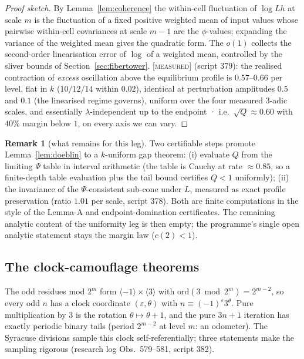 \documentclass[11pt]{article}
\theoremstyle{definition}
\newtheorem{remark}[theorem]{Remark}
\newcommand{\MEASURED}{\textup{[\textsc{measured}]}}
\newcommand{\lam}{\lambda}
\begin{document}
\begin{proof}[Proof sketch]
By Lemma~\ref{lem:coherence} the within-cell fluctuation of $\log Lh$ at
scale $m$ is the fluctuation of a fixed positive weighted mean of input
values whose pairwise within-cell covariances at scale $m-1$ are the
$\phi$-values; expanding the variance of the weighted mean gives the
quadratic form. The $o(1)$ collects the second-order linearisation error of
$\log$ of a weighted mean, controlled by the sliver bounds of
Section~\ref{sec:fibertower}. \MEASURED{} (script 379): the realised
contraction of \emph{excess} oscillation above the equilibrium profile is
$0.57$--$0.66$ per level, flat in $k$ ($10/12/14$ within $0.02$), identical
at perturbation amplitudes $0.5$ and $0.1$ (the linearised regime governs),
uniform over the four measured $3$-adic scales, and essentially
$\lam$-independent up to the endpoint · i.e.\ $\sqrt{Q} \approx 0.60$ with
$40\%$ margin below $1$, on every axis we can vary.
\end{proof}

\begin{remark}[what remains for this leg]\label{rem:doeblinstatus}
Two certifiable steps promote Lemma~\ref{lem:doeblin} to a $k$-uniform gap
theorem: (i) evaluate $Q$ from the limiting $\Psi$ table in interval
arithmetic (the table is Cauchy at rate $\approx 0.85$, so a finite-depth
table evaluation plus the tail bound certifies $Q < 1$ uniformly); (ii) the
invariance of the $\Psi$-consistent sub-cone under $L$, measured as exact
profile preservation (ratio $1.01$ per scale, script 378). Both are
finite computations in the style of the Lemma-A and endpoint-domination
certificates. The remaining analytic content of the uniformity leg is then
empty; the programme's single open analytic statement stays the margin law
($c(2) < 1$).
\end{remark}


\subsection{The clock-camouflage theorems}
\label{sec:clock}

The odd residues mod $2^m$ form $\langle -1\rangle \times \langle 3\rangle$
with $\mathrm{ord}(3 \bmod 2^m) = 2^{m-2}$, so every odd $n$ has a clock
coordinate $(\varepsilon, \theta)$ with $n \equiv (-1)^{\varepsilon}
3^{\theta}$. Pure multiplication by $3$ is the rotation $\theta \mapsto
\theta + 1$, and the pure $3n{+}1$ iteration has exactly periodic binary
tails (period $2^{m-2}$ at level $m$: an odometer). The Syracuse divisions
sample this clock self-referentially; three statements make the sampling
rigorous (research log Obs.~579--581, script 382).
\end{document}

